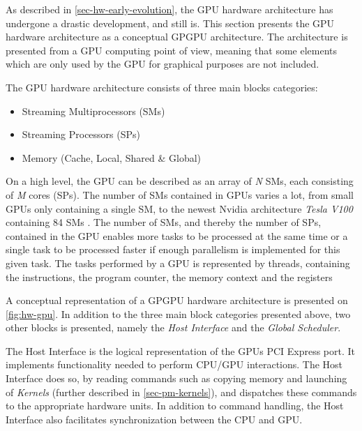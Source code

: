 As described in \cref{sec-hw-early-evolution}, the GPU hardware architecture has undergone a drastic development, and still is.
This section presents the GPU hardware architecture as a conceptual GPGPU architecture.
The architecture is presented from a GPU computing point of view, meaning that some elements which are only used by the GPU for graphical purposes are not included.

The GPU hardware architecture consists of three main blocks categories:
\begin{itemize}
	\item Streaming Multiprocessors (SMs)
	\item Streaming Processors (SPs) 
	\item Memory (Cache, Local, Shared \& Global)
\end{itemize}

On a high level, the GPU can be described as an array of \textit{N} SMs, each consisting of \textit{M} cores (SPs). 
The number of SMs contained in GPUs varies a lot, from small GPUs only containing a single SM, to the newest Nvidia architecture \textit{Tesla V100} containing 84 SMs \cite{Nvidia2017}.
The number of SMs, and thereby the number of SPs, contained in the GPU enables more tasks to be processed at the same time or a single task to be processed faster if enough parallelism is implemented for this given task.
The tasks performed by a GPU is represented by threads, containing the instructions, the program counter, the memory context and the registers


A conceptual representation of a GPGPU hardware architecture is presented on \cref{fig:hw-gpu}.
In addition to the three main block categories presented above, two other blocks is presented, namely the \textit{Host Interface} and the \textit{Global Scheduler}.

The Host Interface is the logical representation of the GPUs PCI Express port.
It implements functionality needed to perform CPU/GPU interactions. 
The Host Interface does so, by reading commands such as copying memory and launching of \textit{Kernels} (further described in \cref{sec-pm-kernels}), and dispatches these commands to the appropriate hardware units.
In addition to command handling, the Host Interface also facilitates synchronization between the CPU and GPU. 

